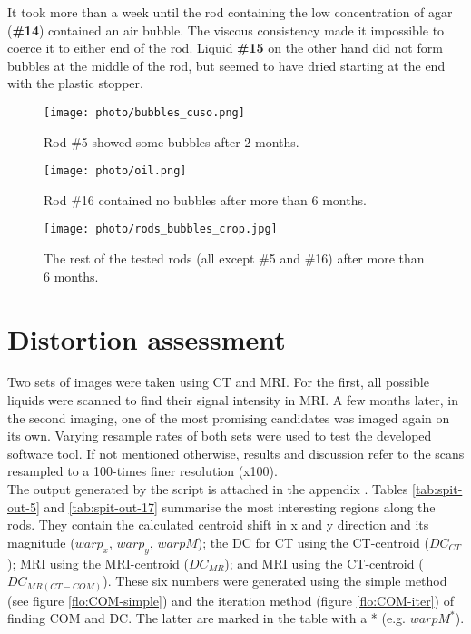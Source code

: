 It took more than a week until the rod containing the low concentration of agar (\textbf{\#14}) contained an air bubble.
The viscous consistency made it impossible to coerce it to either end of the rod.
Liquid \textbf{\#15} on the other hand did not form bubbles at the middle of the rod, but seemed to have dried starting at the end with the plastic stopper.


\begin{figure}[tbh!]
\centering
\texttt{[image: photo/bubbles\_cuso.png]}
\caption{Rod \#5 showed some bubbles after 2 months.}
\label{fig:bubbles_cuso}
\end{figure}

\begin{figure}[tbh!]
\centering
\texttt{[image: photo/oil.png]}
\caption{Rod \#16 contained no bubbles after more than 6 months.}
\label{fig:bubbles_oil}
\end{figure}

\begin{figure}[tbh!]
\centering
\texttt{[image: photo/rods\_bubbles\_crop.jpg]}
\caption{The rest of the tested rods (all except \#5 and \#16) after more than 6 months.}
\label{fig:bubbles}
\end{figure}



\section{Distortion assessment}

Two sets of images were taken using CT and MRI.
For the first, all possible liquids were scanned to find their signal intensity in MRI.
A few months later, in the second imaging, one of the most promising candidates was imaged again on its own.
Varying resample rates of both sets were used to test the developed software tool.
If not mentioned otherwise, results and discussion refer to the scans resampled to a 100-times finer resolution (x100). \\

The output generated by the script is attached in the appendix .
Tables \ref{tab:spit-out-5} and \ref{tab:spit-out-17} summarise the most interesting regions along the rods.
They contain the calculated centroid shift in x and y direction and its magnitude ($warp_x$, $warp_y$, $warpM$); the DC for CT using the CT-centroid ($DC_{CT}$); MRI using the MRI-centroid ($DC_{MR}$); and MRI using the CT-centroid ($DC_{MR(CT-COM)}$).
These six numbers were generated using the simple method (see figure \ref{flo:COM-simple}) and the iteration method (figure \ref{flo:COM-iter}) of finding COM and DC.
The latter are marked in the table with a * (e.g. $warpM^*$).

